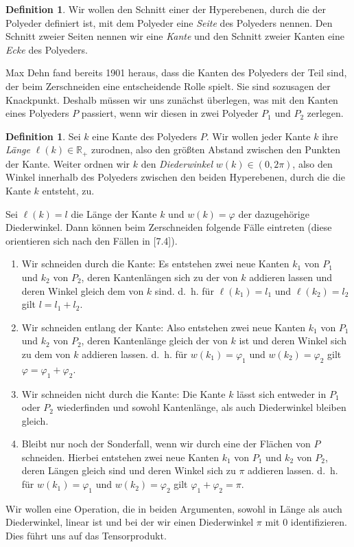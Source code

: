 \documentclass[11pt,titlepage]{article}
\newcommand{\setR}{\mathbb{R}}
\theoremstyle{definition}
\newtheorem{definition}[theorem]{Definition}
\theoremstyle{remark}
\begin{document}
	\begin{definition}
		Wir wollen den Schnitt 
		einer der Hyperebenen, durch die der Polyeder definiert ist, mit dem 
		Polyeder eine \textsl{Seite} des Polyeders nennen. Den Schnitt 
		zweier Seiten nennen wir eine \textsl{Kante} und den Schnitt zweier 
		Kanten eine \textsl{Ecke} des Polyeders.
	\end{definition}
	Max Dehn fand bereits 1901 heraus, 
	dass die Kanten des Polyeders der Teil sind, der beim Zerschneiden 
	eine entscheidende Rolle spielt. Sie sind sozusagen 
	der Knackpunkt. 
	Deshalb müssen wir uns zunächst überlegen, was mit den Kanten eines Polyeders $P$ passiert, wenn wir diesen in zwei 
	Polyeder $P_1$ und $P_2$ zerlegen. 
	\begin{definition}
		Sei $k$ eine Kante des Polyeders $P$.  Wir wollen jeder Kante $k$ ihre \textsl{Länge} $\ell(k)\in\setR_+$ zurodnen, also den größten 
		Abstand zwischen den Punkten der Kante. Weiter ordnen wir $k$ den \textsl{Diederwinkel} $w(k)\in(0,2\pi)$, 
		also den Winkel innerhalb des Polyeders zwischen den beiden Hyperebenen, 
		durch die die Kante $k$ entsteht, zu.
	\end{definition}
	Sei $\ell(k)=l$ die Länge der Kante $k$ und $w(k)=\varphi$ der 
	dazugehörige Diederwinkel. Dann können 
	beim Zerschneiden folgende Fälle eintreten (diese orientieren sich nach 
	den Fällen in \cite{SkriptLA}[7.4]).
	\begin{enumerate}
		\item \label{bem:dehn;1} 
		Wir schneiden durch die Kante: Es entstehen zwei neue Kanten $k_1$ von $P_1$ und $k_2$ von $P_2$, 
		deren Kantenlängen sich zu der von $k$ addieren lassen und deren Winkel gleich dem von $k$ sind. 
		d.~h. für $\ell(k_1)=l_1$ und $\ell(k_2)=l_2$ gilt $l=l_1 +l_2$.
		\item \label{bem:dehn;2} 
		Wir schneiden entlang der Kante: Also entstehen zwei neue Kanten $k_1$ von $P_1$ und $k_2$ von 
		$P_2$, deren Kantenlänge gleich der von $k$ ist und deren Winkel sich zu dem von $k$ addieren lassen. 
		d.~h. für $w(k_1)=\varphi_1$ und $w(k_2)=\varphi_2$ gilt $\varphi=\varphi_1 +\varphi_2$.
		\item \label{bem:dehn;3} 
		Wir schneiden nicht durch die Kante: Die Kante $k$ lässt sich entweder in $P_1$ oder $P_2$ 
		wiederfinden und sowohl Kantenlänge, als auch Diederwinkel bleiben gleich.
		\item \label{bem:dehn;4} 
		Bleibt nur noch der Sonderfall, wenn wir durch eine der Flächen von $P$ schneiden. Hierbei entstehen zwei neue Kanten $k_1$ von $P_1$ und $k_2$ von $P_2$, deren Längen gleich sind und deren Winkel sich zu $\pi$ addieren lassen. d.~h. für $w(k_1)=\varphi_1$ und 
		$w(k_2)=\varphi_2$ gilt $\varphi_1 +\varphi_2 =\pi$.
	\end{enumerate}
	Wir wollen eine Operation, die in beiden Argumenten, sowohl in Länge als auch Diederwinkel, linear ist 
	und bei der wir einen Diederwinkel $\pi$ mit $0$ identifizieren. Dies führt uns auf das Tensorprodukt.
	
\end{document}
